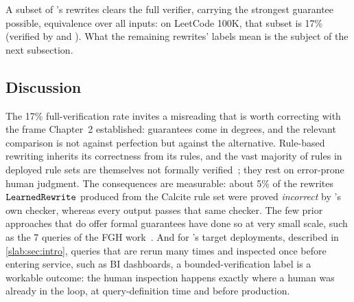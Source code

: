 A subset of \slabcity's rewrites clears the full verifier, carrying
the strongest guarantee possible, equivalence over all inputs: on
LeetCode 100K, that subset is 17\% (verified by \cosette and \spes).
What the remaining rewrites' labels mean is the subject of the next
subsection.

\subsection{Discussion}
\label{slab:sec:eval:discussion}


The 17\% full-verification rate invites a misreading that is worth
correcting with the frame Chapter~2 established: guarantees come in
degrees, and the relevant comparison is not against perfection but
against the alternative. Rule-based rewriting inherits its correctness
from its rules, and the vast majority of rules in deployed rule sets
are themselves not formally
verified~\cite{chu2017hottsql,chu2018axiomatic}; they rest on
error-prone human judgment. The consequences are measurable: about
5\% of the rewrites $\texttt{LearnedRewrite}$ produced from the Calcite rule
set were proved \emph{incorrect} by \toolname's own checker, whereas
every \toolname output passes that same checker. The few prior
approaches that do offer formal guarantees have done so at very small
scale, such as the 7 queries of the FGH
work~\cite{wang2022optimizing}. And for \slabcity's target
deployments, described in \cref{slab:sec:intro}, queries that are
rerun many times and inspected once before entering service, such as
BI dashboards, a bounded-verification label is a workable outcome: the
human inspection happens exactly where a human was already in the
loop, at query-definition time and before production.

